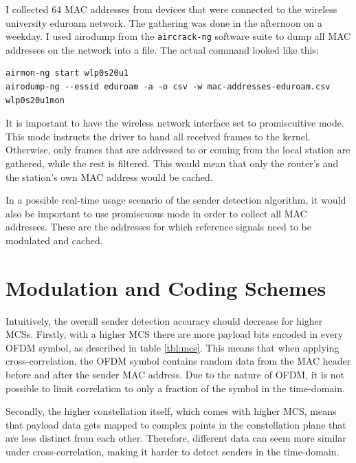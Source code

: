 I collected 64 MAC addresses from devices that were connected to the wireless university eduroam network. The gathering was done in the afternoon on a weekday. I used airodump from the \texttt{aircrack-ng} software suite to dump all MAC addresses on the network into a file. The actual command looked like this:

\begin{lstlisting}[captionpos=b,caption={Capture Real-World MAC Addresses},label=lst:airodump]
airmon-ng start wlp0s20u1
airodump-ng --essid eduroam -a -o csv -w mac-addresses-eduroam.csv wlp0s20u1mon
\end{lstlisting}

It is important to have the wireless network interface set to promiscuitive mode. This mode instructs the driver to hand all received frames to the kernel. Otherwise, only frames that are addressed to or coming from the local station are gathered, while the rest is filtered. This would mean that only the router's and the station's own MAC address would be cached.

In a possible real-time usage scenario of the sender detection algorithm, it would also be important to use promiscuous mode in order to collect all MAC addresses. These are the addresses for which reference signals need to be modulated and cached.



\section{Modulation and Coding Schemes}

Intuitively, the overall sender detection accuracy should decrease for higher \glspl{MCS}. Firstly, with a higher \gls{MCS} there are more payload bits encoded in every \gls{OFDM} symbol, as described in table \ref{tbl:mcs}. This means that when applying cross-correlation, the \gls{OFDM} symbol contains random data from the MAC header before and after the sender MAC address. Due to the nature of \gls{OFDM}, it is not possible to limit correlation to only a fraction of the symbol in the time-domain.

Secondly, the higher constellation itself, which comes with higher \gls{MCS}, means that payload data gets mapped to complex points in the constellation plane that are less distinct from each other. Therefore, different data can seem more similar under cross-correlation, making it harder to detect senders in the time-domain.\\

